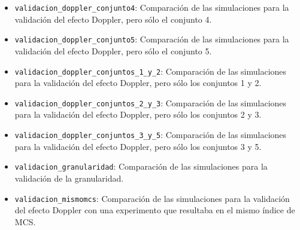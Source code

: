 \documentclass[12pt]{report} %
\begin{document}
\begin{itemize}
Comparación de las simulaciones para la validación del efecto Doppler,
pero sólo el conjunto 3.
\item \verb|validacion_doppler_conjunto4|:
Comparación de las simulaciones para la validación del efecto Doppler,
pero sólo el conjunto 4.
\item \verb|validacion_doppler_conjunto5|:
Comparación de las simulaciones para la validación del efecto Doppler,
pero sólo el conjunto 5.
\item \verb|validacion_doppler_conjuntos_1_y_2|:
Comparación de las simulaciones para la validación del efecto Doppler,
pero sólo los conjuntos 1 y 2.
\item \verb|validacion_doppler_conjuntos_2_y_3|:
Comparación de las simulaciones para la validación del efecto Doppler,
pero sólo los conjuntos 2 y 3.
\item \verb|validacion_doppler_conjuntos_3_y_5|:
Comparación de las simulaciones para la validación del efecto Doppler,
pero sólo los conjuntos 3 y 5.
\item \verb|validacion_granularidad|:
Comparación de las simulaciones para la validación de la granularidad.
\item \verb|validacion_mismomcs|:
Comparación de las simulaciones para la validación del efecto Doppler con una experimento que resultaba en el mismo índice de MCS.
\end{itemize}
\end{document}
